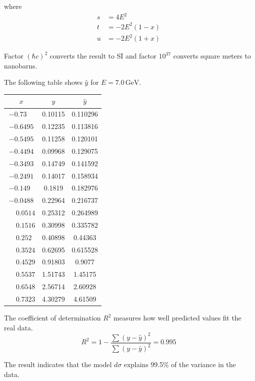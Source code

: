 \documentclass[12pt]{article}
\begin{document}
\noindent
where
\begin{align*}
s&=4E^2
\\
t&=-2E^2(1-x)
\\
u&=-2E^2(1+x)
\end{align*}

\noindent
Factor $(\hbar c)^2$ converts the result to SI and factor $10^{37}$ converts square meters to nanobarns.

\bigskip
\noindent
The following table shows $\hat{y}$ for $E=7.0\,\text{GeV}$.

\begin{center}
\begin{tabular}{|c|c|c|}
\hline
$x$ & $y$ & $\hat{y}$\\
\hline
$-0.73\phantom{00}$ & 0.10115 & 0.110296\\
$-0.6495$ & 0.12235 & 0.113816\\
$-0.5495$ & 0.11258 & 0.120101\\
$-0.4494$ & 0.09968 & 0.129075\\
$-0.3493$ & 0.14749 & 0.141592\\
$-0.2491$ & 0.14017 & 0.158934\\
$-0.149\phantom{0}$ & 0.1819\phantom{0} & 0.182976\\
$-0.0488$ & 0.22964 & 0.216737\\
$\phantom{+}0.0514$ & 0.25312 & 0.264989\\
$\phantom{+}0.1516$ & 0.30998 & 0.335782\\
$\phantom{+}0.252\phantom{0}$ & 0.40898 & 0.44363\phantom{0}\\
$\phantom{+}0.3524$ & 0.62695 & 0.615528\\
$\phantom{+}0.4529$ & 0.91803 & 0.9077\phantom{00}\\
$\phantom{+}0.5537$ & 1.51743 & 1.45175\phantom{0}\\
$\phantom{+}0.6548$ & 2.56714 & 2.60928\phantom{0}\\
$\phantom{+}0.7323$ & 4.30279 & 4.61509\phantom{0}\\
\hline
\end{tabular}
\end{center}

\noindent
The coefficient of determination $R^2$ measures how well predicted values fit the real data.
\begin{equation*}
R^2=1-\frac{\sum(y-\hat{y})^2}{\sum(y-\bar{y})^2}=0.995
\end{equation*}

\noindent
The result indicates that the model $d\sigma$ explains 99.5\% of the variance in the data.
\end{document}
